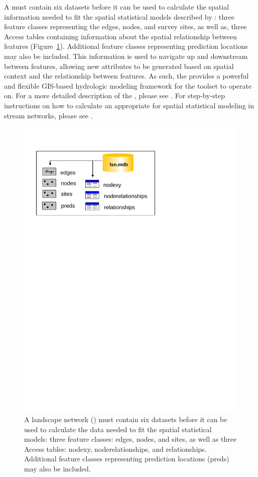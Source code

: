 \documentclass[article]{jss}
\begin{document}
A  must contain six datasets before it can be used to calculate
the spatial information needed to fit the spatial statistical models
described by \citet{Ver:Pete:Move:2010}: three feature classes
representing the edges, nodes, and survey sites, as well as, three
Access tables containing information about the spatial relationship
between features (Figure~\ref{Fig2}). Additional feature classes
representing prediction locations may also be included. This
information is used to navigate up and downstream between features,
allowing new attributes to be generated based on spatial context and
the relationship between features. As such, the  provides a
powerful and flexible GIS-based hydrologic modeling framework for the
 toolset to operate on. For a more detailed description of
the , please see \citet{Theo:Norm:Pete:Ferr:Wade:func:2006}. For
step-by-step instructions on how to calculate an  appropriate for
spatial statistical modeling in stream networks, please see \citet{Pete:STAR:2011}.
\begin{figure}[htbp]
  \begin{center}
    \includegraphics[width=350pt,keepaspectratio]{Figures/Fig2.pdf}
  \end{center}
  \caption{A landscape network () must contain six datasets before it can be used to calculate the data needed to fit the spatial statistical models: three feature classes: edges, nodes, and sites, as well as three Access tables: nodexy, noderelationships, and relationships. Additional feature classes representing prediction locations (preds) may also be included. \label{Fig2}}
\end{figure}
\end{document}
